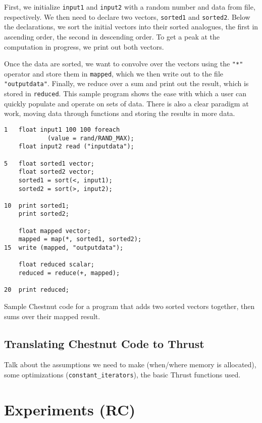 \documentclass[twocolumn]{article}
\renewcommand{\|}{\origbar} %
\newcommand{\code}[1]{\texttt{#1}}
\begin{document}
First, we initialize \code{input1} and \code{input2} with a random number and data from file, respectively. We then need to declare two vectors, \code{sorted1} and \code{sorted2}. Below the declarations, we sort the initial vectors into their sorted analogues, the first in ascending order, the second in descending order. To get a peak at the computation in progress, we print out both vectors.

Once the data are sorted, we want to convolve over the vectors using the \code{"*"} operator and store them in \code{mapped}, which we then write out to the file \code{"outputdata"}. Finally, we reduce over a sum and print out the result, which is stored in \code{reduced}. This sample program shows the ease with which a user can quickly populate and operate on sets of data. There is also a clear paradigm at work, moving data through functions and storing the results in more data.

\begin{Code Snippet}
\begin{verbatim}
1   float input1 100 100 foreach 
            (value = rand/RAND_MAX);
    float input2 read ("inputdata");

5   float sorted1 vector;
    float sorted2 vector;
    sorted1 = sort(<, input1);
    sorted2 = sort(>, input2);

10  print sorted1;
    print sorted2;

    float mapped vector;
    mapped = map(*, sorted1, sorted2);
15  write (mapped, "outputdata");

    float reduced scalar;
    reduced = reduce(+, mapped);

20  print reduced;
\end{verbatim}
\caption{Sample Chestnut code for a program that adds two sorted vectors together, then sums over their mapped result.}
\label{code:fullprog}
\end{Code Snippet}


\subsection{Translating Chestnut Code to Thrust}

Talk about the assumptions we need to make (when/where memory is allocated), some optimizations (\code{constant\_iterators}), the basic Thrust functions used.

\section{Experiments (RC)}
\end{document}

